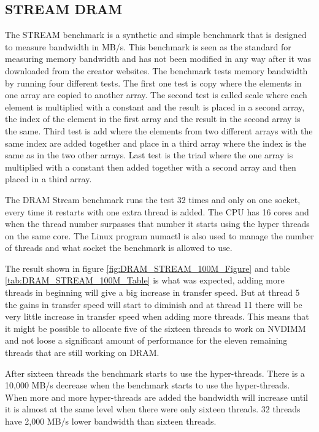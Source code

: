 \documentclass[12pt,a4paper,USenglish]{article}      %
\begin{document}
\subsection{STREAM DRAM}
\label{section:STREAMDRAM}
The STREAM\cite{STREAM-c} benchmark is a synthetic and simple benchmark that is designed to measure bandwidth in MB/s. This benchmark is seen as the standard for measuring memory bandwidth and has not been modified in any way after it was downloaded from the creator websites.
The benchmark tests memory bandwidth by running four different tests. The first one test is copy where the elements in one array are copied to another array.
The second test is called scale where each element is multiplied with a constant and the result is placed in a second array, the index of the element in the first array and the result in the second array is the same.
Third test is add where the elements from two different arrays with the same index are added together and place in a third array where the index is the same as in the two other arrays.
Last test is the triad where the one array is multiplied with a constant then added together with a second array and then placed in a third array.

The DRAM Stream benchmark runs the test 32 times and only on one socket, every time it restarts with one extra thread is added. The CPU has 16 cores and when the thread number surpasses that number it starts using the hyper threads on the same core. The Linux program numactl is also used to manage the number of threads and what socket the benchmark is allowed to use.

The result shown in figure \ref{fig:DRAM_STREAM_100M_Figure} and table \ref{tab:DRAM_STREAM_100M_Table} is what was expected, adding more threads in beginning will give a big increase in transfer speed. But at thread 5 the gains in transfer speed will start to diminish and at thread 11 there will be very little increase in transfer speed when adding more threads.
This means that it might be possible to allocate five of the sixteen threads to work on NVDIMM and not loose a significant amount of performance for the eleven remaining threads that are still working on DRAM. 

After sixteen threads the benchmark starts to use the hyper-threads. There is a 10,000 MB/s decrease when the benchmark starts to use the hyper-threads. When more and more hyper-threads are added the bandwidth will increase until it is almost at the same level when there were only sixteen threads. 32 threads have 2,000 MB/s lower bandwidth than sixteen threads.
\end{document}
